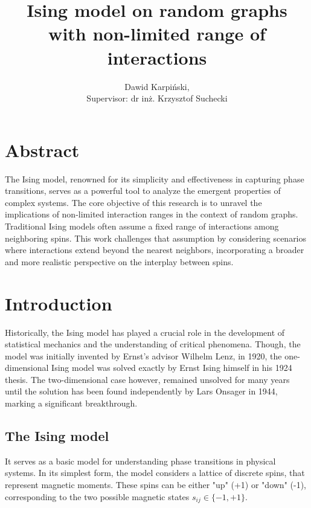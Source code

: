 \documentclass[11pt,a4paper]{article}
\begin{document}
\title{Ising model on random graphs with non-limited range of interactions}
\author{Dawid Karpiński,\\Supervisor: dr inż. Krzysztof Suchecki}
\date{}
\maketitle

\section*{Abstract}

The Ising model, renowned for its simplicity and effectiveness in capturing phase transitions, serves as a powerful tool to analyze the emergent properties of complex systems. The core objective of this research is to unravel the implications of non-limited interaction ranges in the context of random graphs. Traditional Ising models often assume a fixed range of interactions among neighboring spins. This work challenges that assumption by considering scenarios where interactions extend beyond the nearest neighbors, incorporating a broader and more realistic perspective on the interplay between spins.

\section{Introduction}

Historically, the Ising model has played a crucial role in the development of statistical mechanics and the understanding of critical phenomena.  Though, the model was initially invented by Ernst's advisor Wilhelm Lenz, in 1920, the one-dimensional Ising model was solved exactly by Ernst Ising himself in his 1924 thesis. The two-dimensional case however, remained unsolved for many years until the solution has been found independently by Lars Onsager in 1944, marking a significant breakthrough.


\subsection{The Ising model}

It serves as a basic model for understanding phase transitions in physical systems. In its simplest form, the model considers a lattice of discrete spins, that represent magnetic moments. These spins can be either "up" (+1) or "down" (-1), corresponding to the two possible magnetic states $s_{ij}\in\{-1, +1\}$.
\end{document}
